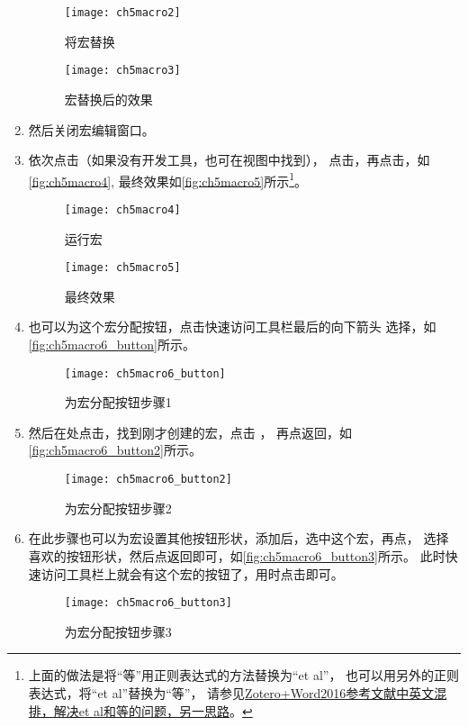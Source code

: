 \documentclass[cn,11pt,chinese]{elegantbook}
\begin{document}
\begin{enumerate}
			\begin{figure}[htbp]
				\centering
				\texttt{[image: ch5macro2]}
				\caption{将宏替换}
				\label{fig:ch5macro2}
			\end{figure}
			\begin{figure}[htbp]
				\centering
				\texttt{[image: ch5macro3]}
				\caption{宏替换后的效果}
				\label{fig:ch5macro3}
			\end{figure}
		\item 然后关闭宏编辑窗口。
		\item 依次点击（如果没有开发工具，也可在视图中找到），
		点击，再点击，如\autoref{fig:ch5macro4},
		最终效果如\autoref{fig:ch5macro5}所示\footnote{
			上面的做法是将“等”用正则表达式的方法替换为“et al”，
						也可以用另外的正则表达式，将“et al”替换为“等”，
						请参见\href{https://zhuanlan.zhihu.com/p/60029219}
						{Zotero+Word2016参考文献中英文混排，解决et al和等的问题，另一思路}。
		}。
			\begin{figure}[htbp]
				\centering
				\texttt{[image: ch5macro4]}
				\caption{运行宏}
				\label{fig:ch5macro4}
			\end{figure}
			\begin{figure}[htbp]
				\centering
				\texttt{[image: ch5macro5]}
				\caption{最终效果}
				\label{fig:ch5macro5}
			\end{figure}
		\item 也可以为这个宏分配按钮，点击快速访问工具栏最后的向下箭头
		选择，如\autoref{fig:ch5macro6_button}所示。	
				\begin{figure}[htbp]
					\centering
					\texttt{[image: ch5macro6\_button]}
					\caption{为宏分配按钮步骤1}
					\label{fig:ch5macro6_button}
				\end{figure}
		\item 然后在处点击，找到刚才创建的宏，点击
		，
		再点返回，如\autoref{fig:ch5macro6_button2}所示。		
				\begin{figure}[htbp]
					\centering
					\texttt{[image: ch5macro6\_button2]}
					\caption{为宏分配按钮步骤2}
					\label{fig:ch5macro6_button2}
				\end{figure}
		\item 在此步骤也可以为宏设置其他按钮形状，添加后，选中这个宏，再点，
		选择喜欢的按钮形状，然后点返回即可，如\autoref{fig:ch5macro6_button3}所示。
		此时快速访问工具栏上就会有这个宏的按钮了，用时点击即可。	
			\begin{figure}[htbp]
				\centering
				\texttt{[image: ch5macro6\_button3]}
				\caption{为宏分配按钮步骤3}
				\label{fig:ch5macro6_button3}
			\end{figure}
		\end{enumerate}
		
\end{document}
